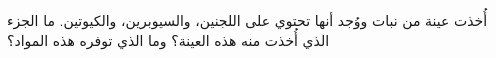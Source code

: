 
\begin{question}

\begin{instance}

\begin{mcq}[standalone=false]

\begin{stem}
أُخذت عينة من نبات ووُجد أنها تحتوي على اللجنين، والسيوبرين، والكيوتين. ما الجزء الذي أُخذت منه هذه العينة؟ وما الذي توفره هذه المواد؟ \par

\end{stem}

\begin{distractors}
        
\end{distractors}

\end{mcq}

\end{instance}

\end{question}
